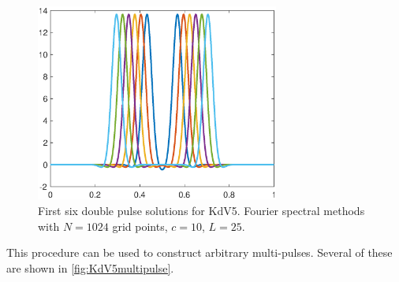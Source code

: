\documentclass[thesis2.tex]{subfiles}
\begin{document}
\begin{figure}
\begin{center}
\includegraphics[width=8cm]{images/kdv5numerics/double10.eps}
\caption[Double pulse solutions for KdV5]{First six double pulse solutions for KdV5. Fourier spectral methods with $N = 1024$ grid points, $c = 10$, $L = 25$.}
\label{fig:KdV5doublepulse}
\end{center}
\end{figure}

This procedure can be used to construct arbitrary multi-pulses. Several of these are shown in \cref{fig:KdV5multipulse}.
\end{document}
